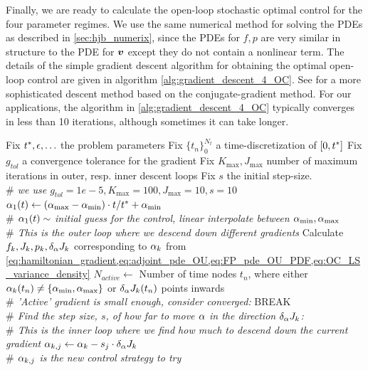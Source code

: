 \documentclass[12pt]{iopart}
\begin{document}
Finally, we are ready to calculate the open-loop stochastic optimal control for
the four parameter regimes. We use the same numerical method for solving the
PDEs as described in \cref{sec:hjb_numerix}, since the PDEs for $f,p$ are very
similar in structure to the PDE for ${ \boldsymbol{v} }$ except they do not contain a nonlinear
term. The details of the simple gradient descent algorithm for obtaining the
optimal open-loop control are given in algorithm
\ref{alg:gradient_descent_4_OC}. See \cite{Annunziato2013} for a more
sophisticated descent method based on the conjugate-gradient method. For our
applications, the algorithm in \ref{alg:gradient_descent_4_OC} typically
converges in less than 10 iterations, although sometimes it can take longer. 
\begin{algorithm}
\begin{algorithmic}
\State Fix ${ t^* }, {\epsilon}, \ldots$ the problem parameters
\State Fix $\{t_n\}_0^{N_t}$ a time-discretization of $[0,{ t^* }]$
\State Fix $g_{tol}$ a convergence tolerance for the gradient
\State Fix $K_{\max}, J_{\max}$ number of maximum iterations in outer, resp.
inner descent loops
\State Fix $s$ the initial step-size. 
\\ {\itshape $\#$ we use $g_{tol}=1e-5,K_{\max}=100,J_{\max}=10,s=10$}
\State ${\alpha}_1(t) \gets ({ {\alpha}_{\textrm{max}} }-{ {\alpha}_{\textrm{min}} }) \cdot t / { t^* } + { {\alpha}_{\textrm{min}} }$ 
\\{\itshape  $\#$ ${\alpha}_1(t) \sim$ initial guess for the control, linear
interpolate between ${ {\alpha}_{\textrm{min}} }, { {\alpha}_{\textrm{max}} }$}
\\ {\itshape $\#$ This is the outer loop where we descend down different
gradients}
 \State Calculate $f_k,J_{k},p_k, \delta_{\alpha} J_k$ corresponding to
	${\alpha}_k$ from
	\cref{eq:hamiltonian_gradient,eq:adjoint_pde_OU,eq:FP_pde_OU_PDF,eq:OC_LS_variance_density}
	\State $N_{active}\gets$   Number of time nodes $t_n$, where either
	${\alpha}_k(t_n) \neq \{{ {\alpha}_{\textrm{min}} }, { {\alpha}_{\textrm{max}} }\}$ or $\delta_{\alpha} J_k(t_n)$ points inwards
		  \\ {\itshape  $\#$ 'Active' gradient is small enough,
		 consider converged:}
		 \State BREAK
	\EndIf
	\\ {\itshape $\#$ Find the step size, $s$, of how far to move ${\alpha}$ in the
	direction $\delta_{\alpha} J_k$:}
	\\ {\itshape $\#$ This is the inner loop where we find how much to descend down
	the current gradient}
	\State ${\alpha}_{k,j} \gets {\alpha}_{k} - s_j \cdot \delta_{\alpha} J_k  $
	\\ {\itshape $\#$ ${\alpha}_{k,j}$ is the new control strategy to try}

\end{algorithmic}
\end{algorithm}
\end{document}
